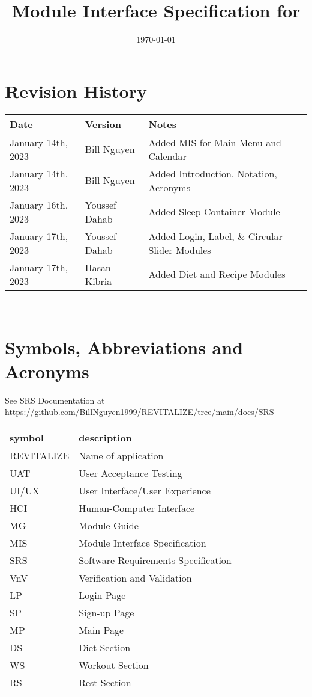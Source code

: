 \documentclass[12pt, titlepage]{article}
\begin{document}
\title{Module Interface Specification for \progname{}}

\author{\authname}

\date{\today}

\maketitle


\section{Revision History}

\begin{tabularx}{\textwidth}{p{3cm}p{2cm}X}
	\toprule {\bf Date} & {\bf Version} & {\bf Notes}\\
	\midrule
	January 14th, 2023 & Bill Nguyen  & Added MIS for Main Menu and Calendar\\
	January 14th, 2023 & Bill Nguyen  & Added Introduction, Notation, Acronyms\\
	January 16th, 2023 & Youssef Dahab & Added Sleep Container Module\\
	January 17th, 2023 & Youssef Dahab & Added Login, Label, \& Circular Slider Modules\\
	January 17th, 2023 & Hasan Kibria & Added Diet and Recipe Modules\\
	\bottomrule
\end{tabularx}

~\newpage

\section{Symbols, Abbreviations and Acronyms}

See SRS Documentation at \url{https://github.com/BillNguyen1999/REVITALIZE/tree/main/docs/SRS}

\renewcommand{\arraystretch}{1.2}
\begin{tabular}{l l} 
	\toprule		
	\textbf{symbol} & \textbf{description}\\
	\midrule 
	REVITALIZE & Name of application\\
	UAT & User Acceptance Testing\\
	UI/UX & User Interface/User Experience\\
	HCI & Human-Computer Interface\\
	MG & Module Guide\\
	MIS & Module Interface Specification\\
	SRS & Software Requirements Specification\\
	VnV & Verification and Validation\\
	LP & Login Page\\
	SP & Sign-up Page\\
	MP & Main Page\\
	DS & Diet Section\\
	WS & Workout Section\\
	RS & Rest Section\\
	\bottomrule
\end{tabular}\\
\end{document}

